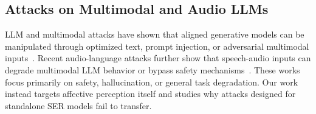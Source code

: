 \subsection{Attacks on Multimodal and Audio LLMs}

LLM and multimodal attacks have shown that aligned generative models can be manipulated through optimized text, prompt injection, or adversarial multimodal inputs~\cite{zou2023gcg,perez2022ignore,mirage}.
Recent audio-language attacks further show that speech-audio inputs can degrade multimodal LLM behavior or bypass safety mechanisms~\cite{sacred,audiojailbreak}.
These works focus primarily on safety, hallucination, or general task degradation.
Our work instead targets affective perception itself and studies why attacks designed for standalone SER models fail to transfer.
